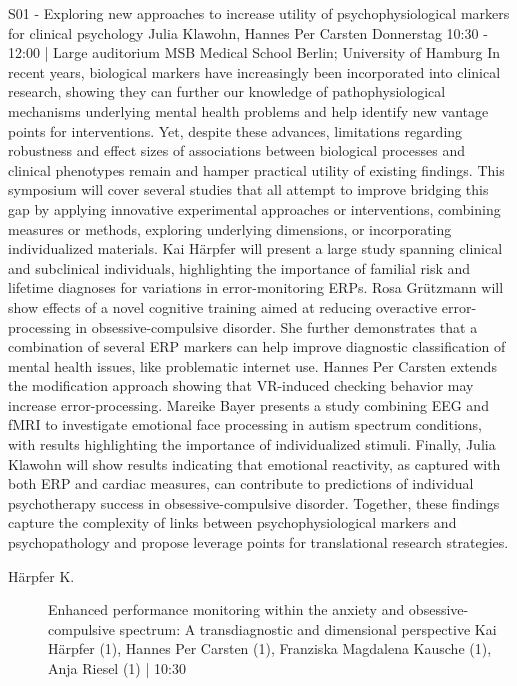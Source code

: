 
            \begin{symposium}
            {S01 - Exploring new approaches to increase utility of psychophysiological markers for clinical psychology}
            {Julia Klawohn, Hannes Per Carsten}
            {Donnerstag 10:30 - 12:00 | Large auditorium}
            {MSB Medical School Berlin; University of Hamburg}
            In recent years, biological markers have increasingly been incorporated into clinical research, showing they can further our knowledge of pathophysiological mechanisms underlying mental health problems and help identify new vantage points for interventions. Yet, despite these advances, limitations regarding robustness and effect sizes of associations between biological processes and clinical phenotypes remain and hamper practical utility of existing findings. This symposium will cover several studies that all attempt to improve bridging this gap by applying innovative experimental approaches or interventions, combining measures or methods, exploring underlying dimensions, or incorporating individualized materials. Kai Härpfer will present a large study spanning clinical and subclinical individuals, highlighting the importance of familial risk and lifetime diagnoses for variations in error-monitoring ERPs. Rosa Grützmann will show effects of a novel cognitive training aimed at reducing overactive error-processing in obsessive-compulsive disorder. She further demonstrates that a combination of several ERP markers can help improve diagnostic classification of mental health issues, like problematic internet use. Hannes Per Carsten extends the modification approach showing that VR-induced checking behavior may increase error-processing. Mareike Bayer presents a study combining EEG and fMRI to investigate emotional face processing in autism spectrum conditions, with results highlighting the importance of individualized stimuli. Finally, Julia Klawohn will show results indicating that emotional reactivity, as captured with both ERP and cardiac measures, can contribute to predictions of individual psychotherapy success in obsessive-compulsive disorder. Together, these findings capture the complexity of links between psychophysiological markers and psychopathology and propose leverage points for translational research strategies.
            \begin{description}    
            
                \item [ Härpfer K.] Enhanced performance monitoring within the anxiety and obsessive-compulsive spectrum: A transdiagnostic and dimensional perspective
Kai Härpfer (1), Hannes Per Carsten (1), Franziska Magdalena Kausche (1), Anja Riesel (1) \textcolor{mygray}{ | 10:30}    
                

\end{description}
\end{symposium}
